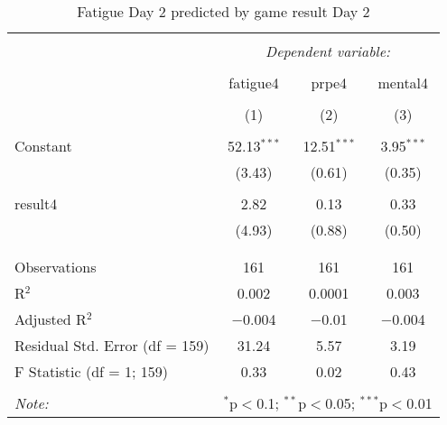 
\begin{table}[!htbp] \centering 
  \caption{Fatigue Day 2 predicted by game result Day 2} 
  \label{tab:fatigueDay2Result} 
\footnotesize 
\begin{tabular}{@{\extracolsep{5pt}}lccc} 
\\[-1.8ex]\hline 
\hline \\[-1.8ex] 
 & \multicolumn{3}{c}{\textit{Dependent variable:}} \\ 
\cline{2-4} 
\\[-1.8ex] & fatigue4 & prpe4 & mental4 \\ 
\\[-1.8ex] & (1) & (2) & (3)\\ 
\hline \\[-1.8ex] 
 Constant & 52.13$^{***}$ & 12.51$^{***}$ & 3.95$^{***}$ \\ 
  & (3.43) & (0.61) & (0.35) \\ 
  & & & \\ 
 result4 & 2.82 & 0.13 & 0.33 \\ 
  & (4.93) & (0.88) & (0.50) \\ 
  & & & \\ 
\hline \\[-1.8ex] 
Observations & 161 & 161 & 161 \\ 
R$^{2}$ & 0.002 & 0.0001 & 0.003 \\ 
Adjusted R$^{2}$ & $-$0.004 & $-$0.01 & $-$0.004 \\ 
Residual Std. Error (df = 159) & 31.24 & 5.57 & 3.19 \\ 
F Statistic (df = 1; 159) & 0.33 & 0.02 & 0.43 \\ 
\hline 
\hline \\[-1.8ex] 
\textit{Note:}  & \multicolumn{3}{r}{$^{*}$p$<$0.1; $^{**}$p$<$0.05; $^{***}$p$<$0.01} \\ 
\end{tabular} 
\end{table} 
